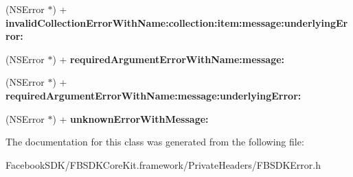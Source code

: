 \begin{DoxyCompactItemize}
\item 
\hypertarget{interface_f_b_s_d_k_error_a4178dc45f4d622034c2ec5311ae05a65}{(N\-S\-Error $\ast$) + {\bfseries invalid\-Collection\-Error\-With\-Name\-:collection\-:item\-:message\-:underlying\-Error\-:}}\label{interface_f_b_s_d_k_error_a4178dc45f4d622034c2ec5311ae05a65}

\item 
\hypertarget{interface_f_b_s_d_k_error_a24c0513937ccab0429e7b2c888896b28}{(N\-S\-Error $\ast$) + {\bfseries required\-Argument\-Error\-With\-Name\-:message\-:}}\label{interface_f_b_s_d_k_error_a24c0513937ccab0429e7b2c888896b28}

\item 
\hypertarget{interface_f_b_s_d_k_error_a9ceb094f4f9476b9390ae5bebe1082bc}{(N\-S\-Error $\ast$) + {\bfseries required\-Argument\-Error\-With\-Name\-:message\-:underlying\-Error\-:}}\label{interface_f_b_s_d_k_error_a9ceb094f4f9476b9390ae5bebe1082bc}

\item 
\hypertarget{interface_f_b_s_d_k_error_ab150118177017ff27bd85cc02ceeb7d6}{(N\-S\-Error $\ast$) + {\bfseries unknown\-Error\-With\-Message\-:}}\label{interface_f_b_s_d_k_error_ab150118177017ff27bd85cc02ceeb7d6}

\end{DoxyCompactItemize}


The documentation for this class was generated from the following file\-:\begin{DoxyCompactItemize}
\item 
Facebook\-S\-D\-K/\-F\-B\-S\-D\-K\-Core\-Kit.\-framework/\-Private\-Headers/F\-B\-S\-D\-K\-Error.\-h\end{DoxyCompactItemize}
